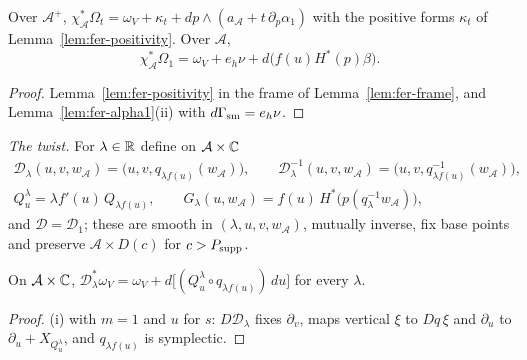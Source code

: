 \begin{lemma}\label{lem:shd4-frame-forms}
Over $\mathcal A^+$, $\chi_{\mathcal A}^*\Omega_t=\omega_V+\kappa_t+dp\wedge(a_{\mathcal A}+t\,\partial_p\alpha_1)$ with the positive forms
$\kappa_t$ of Lemma~\ref{lem:fer-positivity}. Over $\mathcal A$,
\[
 \chi_{\mathcal A}^*\Omega_1=\omega_V+e_h\nu+d\bigl(f(u)H^*(p)\beta\bigr).
\]
\end{lemma}

\begin{proof}
Lemma~\ref{lem:fer-positivity} in the frame of Lemma~\ref{lem:fer-frame}, and Lemma~\ref{lem:fer-alpha1}(ii) with $d\Gamma_{\rm sm}=e_h\nu$.
\end{proof}

\emph{The twist.} For $\lambda\in\mathbb{R}$ define on $\mathcal A\times\mathbb{C}$
\begin{equation}\label{eq:shd4-twist}
\begin{gathered}
 \mathcal D_\lambda(u,v,w_{\mathcal A})=\bigl(u,v,q_{\lambda f(u)}(w_{\mathcal A})\bigr),\qquad
 \mathcal D_\lambda^{-1}(u,v,w_{\mathcal A})=\bigl(u,v,q^{-1}_{\lambda f(u)}(w_{\mathcal A})\bigr),\\
 Q^\lambda_u=\lambda f'(u)\,Q_{\lambda f(u)},\qquad G_\lambda(u,w_{\mathcal A})=f(u)\,H^*\bigl(p(q_\lambda^{-1}w_{\mathcal A})\bigr),
\end{gathered}
\end{equation}
and $\mathcal D=\mathcal D_1$; these are smooth in $(\lambda,u,v,w_{\mathcal A})$, mutually inverse, fix base points and preserve $\mathcal A\times D(c)$ for $c>P_{\rm supp}$.

\begin{lemma}[Suspension]\label{lem:shd4-suspension}
On $\mathcal A\times\mathbb{C}$, $\mathcal D_\lambda^*\omega_V=\omega_V+d\bigl[(Q^\lambda_u\circ q_{\lambda f(u)})\,du\bigr]$ for every $\lambda$.
\end{lemma}

\begin{proof}
(i) with $m=1$ and $u$ for $s$: $D\mathcal D_\lambda$ fixes $\partial_v$, maps vertical $\xi$ to $Dq\,\xi$ and $\partial_u$ to $\partial_u+X_{Q^\lambda_u}$, and $q_{\lambda f(u)}$ is symplectic.
\end{proof}

